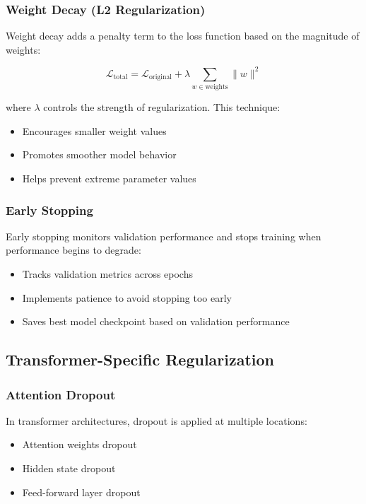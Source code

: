\subsubsection{Weight Decay (L2 Regularization)}
\noindent
Weight decay adds a penalty term to the loss function based on the magnitude of weights:

\begin{equation}
\mathcal{L}_\text{total} = \mathcal{L}_\text{original} + \lambda \sum_{w \in \text{weights}} \|w\|^2
\end{equation}

where $\lambda$ controls the strength of regularization. This technique:
\begin{itemize}
    \item Encourages smaller weight values
    \item Promotes smoother model behavior
    \item Helps prevent extreme parameter values
\end{itemize}

\subsubsection{Early Stopping}
\noindent
Early stopping monitors validation performance and stops training when performance begins to degrade:
\begin{itemize}
    \item Tracks validation metrics across epochs
    \item Implements patience to avoid stopping too early
    \item Saves best model checkpoint based on validation performance
\end{itemize}

\subsection{Transformer-Specific Regularization}

\subsubsection{Attention Dropout}
\noindent
In transformer architectures, dropout is applied at multiple locations:
\begin{itemize}
    \item Attention weights dropout
    \item Hidden state dropout
    \item Feed-forward layer dropout
\end{itemize}

